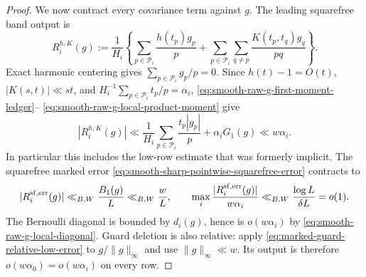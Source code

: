 \documentclass[11pt]{article}
\numberwithin{equation}{section}
\theoremstyle{definition}
\theoremstyle{remark}
\newcommand{\1}{\mathbf 1}
\begin{document}
\begin{proof}
We now contract every covariance term against \(g\).  The leading
squarefree band output is
\[
 R_i^{h,K}(g):=\frac1{H_i}\left\{
  \sum_{p\in\mathcal P_i}\frac{h(t_p)g_p}{p}
  +\sum_{p\in\mathcal P_i}\sum_{q\ne p}
       \frac{K(t_p,t_q)g_q}{pq}\right\}.
\]
Exact harmonic centering gives
\(\sum_{p\in\mathcal P_i}g_p/p=0\).  Since
\(h(t)-1=O(t)\), \(|K(s,t)|\ll st\), and
\(H_i^{-1}\sum_{p\in\mathcal P_i}t_p/p=\alpha_i\),
\eqref{eq:smooth-raw-g-first-moment-ledger}--
\eqref{eq:smooth-raw-g-local-product-moment} give
\begin{equation}
 \left|R_i^{h,K}(g)\right|
 \ll \frac1{H_i}\sum_{p\in\mathcal P_i}
          \frac{t_p|g_p|}{p}
    +\alpha_iG_1(g)
 \ll w\alpha_i.
 \label{eq:smooth-raw-g-leading-band-row}
\end{equation}
In particular this includes the low-row estimate that was formerly
implicit.  The squarefree marked error
\eqref{eq:smooth-sharp-pointwise-squarefree-error} contracts to
\begin{equation}
 |R_i^{\rm sf,err}(g)|
 \ll_{B,W}\frac{B_1(g)}L\ll_{B,W}\frac wL,
 \qquad
 \max_i\frac{|R_i^{\rm sf,err}(g)|}{w\alpha_i}
 \ll_{B,W}\frac{\log L}{\delta L}=o(1).
 \label{eq:smooth-raw-g-squarefree-error}
\end{equation}
The Bernoulli diagonal is bounded by \(d_i(g)\), hence is
\(o(w\alpha_i)\) by
\eqref{eq:smooth-raw-g-local-diagonal}.  Guard deletion is also
relative: apply \eqref{eq:marked-guard-relative-low-error} to
\(g/\|g\|_\infty\) and use \(\|g\|_\infty\ll w\).  Its output is
therefore \(o(w\alpha_0)=o(w\alpha_i)\) on every row.


\end{proof}
\end{document}
